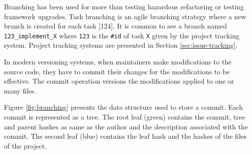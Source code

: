 \documentclass[12pt]{report}
\begin{document}
Branching has been used for more than testing hazardous refactoring or
testing framework upgrades. Task branching is an agile branching
strategy where a new branch is created for each task {[}124{]}. It is
common to see a branch named \lstinline!123_implement_X! where
\lstinline!123! is the \lstinline!#id! of task \lstinline!X! given by
the project tracking system. Project tracking systems are presented in
Section \ref{sec:issue-tracking}.

In modern versioning systems, when maintainers make modifications to the
source code, they have to commit their changes for the modifications to
be effective. The commit operation versions the modifications applied to
one or many files.

Figure \ref{fig:branching} presents the data structure used to store a
commit. Each commit is represented as a tree. The root leaf (green)
contains the commit, tree and parent hashes as same as the author and
the description associated with the commit. The second leaf (blue)
contains the leaf hash and the hashes of the files of the project.
\end{document}
